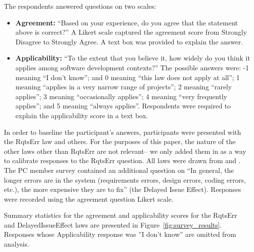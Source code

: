 \documentclass[smallcondesed]{svjour3}
\newcommand{\bi}{\begin{itemize}}%
\newcommand{\ei}{\end{itemize}}
\begin{document}
The respondents answered questions on two scales: 

\bi
\item
\textbf{Agreement:} ``Based on your experience, do you agree that the statement above is correct?'' A Likert scale captured the agreement score from Strongly Disagree to Strongly Agree. A text box was provided to explain the answer. \newline
\item
\textbf{Applicability:} ``To the extent that you believe it, how widely do you think it applies among software development contexts?'' The possible answers were: 
-1 meaning ``I don't know''; and 0 meaning ``this law does not apply at all'';
 1 meaning ``applies in a very narrow range of projects'';  2 meaning
``rarely applies'';   3 meaning
``occasionally applies'';  
4 meaning ``very frequently applies''; and
 5 meaning ``always applies''.
Respondents were required to explain the applicability score in a text box.
\ei

In order to baseline the participant's answers, participants were presented with the RqtsErr law and others. For the purposes
of this paper, the nature of the other laws other than RqtsErr are not relevant-- we
only added them in as a way to calibrate responses to the RqtsErr question. All laws were drawn from \cite{glass02} and \cite{endres03}. 
The PC member survey contained an additional question on ``In general, the longer errors are in the system (requirements errors, design errors, coding errors, etc.), the more expensive they are to fix'' (the Delayed Issue Effect). Responses were recorded using the agreement question Likert scale. 

Summary statistics for the agreement and applicability scores for the RqtsErr and DelayedIssueEffect laws are presented in Figure~\ref{fig:survey_results}. Responses whose Applicability response was ''I don't know'' are omitted from analysis.
\end{document}
